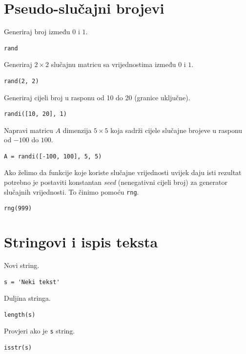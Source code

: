 \documentclass[a4paper, 10pt]{article}
\begin{document}
\section{Pseudo-slučajni brojevi}

Generiraj broj između $0$ i $1$.

\begin{lstlisting}
rand
\end{lstlisting}

Generiraj $2 \times 2$ slučajnu matricu sa vrijednostima između $0$ i $1$. 

\begin{lstlisting}
rand(2, 2)
\end{lstlisting}

Generiraj cijeli broj u rasponu od 10 do 20 (granice uključne).

\begin{lstlisting}
randi([10, 20], 1)
\end{lstlisting}

Napravi matricu $A$ dimenzija $5 \times 5$ koja sadrži cijele slučajne brojeve u rasponu od $-100$ do $100$.

\begin{lstlisting}
A = randi([-100, 100], 5, 5)
\end{lstlisting}

Ako želimo da funkcije koje koriste slučajne vrijednosti uvijek daju isti rezultat potrebno je postaviti konstantan \textit{seed} (nenegativni cijeli broj) za generator slučajnih vrijednosti. To činimo pomoću \texttt{rng}.

\begin{lstlisting}
rng(999)
\end{lstlisting}

\section{Stringovi i ispis teksta}

Novi string.

\begin{lstlisting}
s = 'Neki tekst'
\end{lstlisting}

Duljina stringa.

\begin{lstlisting}
length(s)
\end{lstlisting}

Provjeri ako je \texttt{s} string.

\begin{lstlisting}
isstr(s)
\end{lstlisting}
\end{document}

